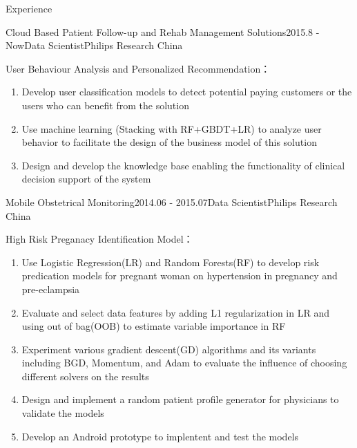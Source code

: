\documentclass{resume} %
\begin{document}
\vspace{-10pt}
\begin{rSection}{Experience}
\begin{rSubsection}{Cloud Based Patient Follow-up and Rehab Management Solutions}{2015.8 -
    Now}{Data Scientist}{Philips Research China}
\item User Behaviour Analysis and Personalized Recommendation：
\begin{enumerate}
\item Develop user classification models to detect potential paying customers or the users who can benefit from the solution
\item Use machine learning (Stacking with RF+GBDT+LR) to analyze user behavior to facilitate the design of the business model of this solution
\item Design and develop the knowledge base enabling the functionality of clinical decision support of the system
\end{enumerate}
\end{rSubsection}


\begin{rSubsection}{Mobile Obstetrical Monitoring}{2014.06 - 2015.07}{Data Scientist}{Philips Research China}
\item High Risk Preganacy Identification Model：
\begin{enumerate}
\item Use Logistic Regression(LR) and Random Forests(RF) to develop risk predication models for pregnant woman on hypertension in pregnancy and pre-eclampsia
\item Evaluate and select data features by adding L1 regularization in LR and using out of bag(OOB) to estimate variable importance in RF
\item Experiment various gradient descent(GD) algorithms and its variants including BGD, Momentum, and Adam to evaluate the influence of choosing different solvers on the results
\item Design and implement a random patient profile generator for physicians to validate the models
\item Develop an Android prototype to implentent and test the models
\end{enumerate}
\end{rSubsection}


\end{rSection}
\end{document}
